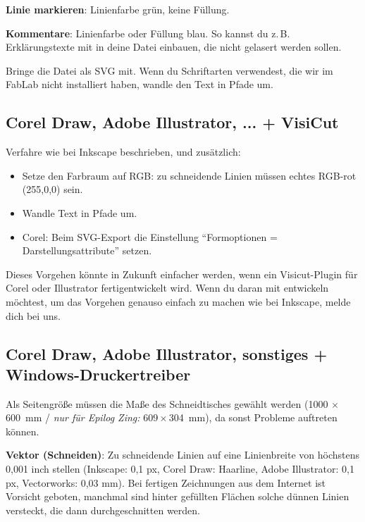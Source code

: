 \documentclass{\basedir/fablab-document}
\newcommand{\nurZing}{\emph{nur für Epilog Zing:} }
\begin{document}
	\textbf{Linie markieren}: Linienfarbe grün, keine Füllung.

	\textbf{Kommentare}: Linienfarbe oder Füllung blau. So kannst du z.\,B. Erklärungstexte mit in deine Datei einbauen, die nicht gelasert werden sollen.

	Bringe die Datei als SVG mit. Wenn du Schriftarten verwendest, die wir im FabLab nicht installiert haben, wandle den Text in Pfade um.


	\subsection{Corel Draw, Adobe Illustrator, ... + VisiCut}
	\label{corel-illustrator-svg-visicut}
	Verfahre wie bei Inkscape beschrieben, und zusätzlich:

	\begin{itemize}
		\item Setze den Farbraum auf RGB: zu schneidende Linien müssen echtes RGB-rot (255,0,0) sein.
		\item Wandle Text in Pfade um.
		\item Corel: Beim SVG-Export die Einstellung \enquote{Formoptionen = Darstellungsattribute} setzen.
	\end{itemize}

	Dieses Vorgehen könnte in Zukunft einfacher werden, wenn ein Visicut-Plugin für Corel oder Illustrator fertigentwickelt wird. Wenn du daran mit entwickeln möchtest, um das Vorgehen genauso einfach zu machen wie bei Inkscape, melde dich bei uns.

	\subsection{Corel Draw, Adobe Illustrator, sonstiges + Windows-Druckertreiber} \label{sec:einstellungen-windowstreiber}
	Als Seitengröße müssen die Maße des Schneidtisches gewählt werden (1000 $\times$ 600~mm / \nurZing 609\,$\times$\,304~mm), da sonst Probleme auftreten können.

	\textbf{Vektor (Schneiden)}: Zu schneidende Linien auf eine Linienbreite von höchstens 0,001 inch stellen (Inkscape: 0,1 px, Corel Draw: Haarline, Adobe Illustrator: 0,1 px, Vectorworks: 0,03 mm). Bei fertigen Zeichnungen aus dem Internet ist Vorsicht geboten, manchmal sind hinter gefüllten Flächen solche dünnen Linien versteckt, die dann durchgeschnitten werden.
\end{document}
